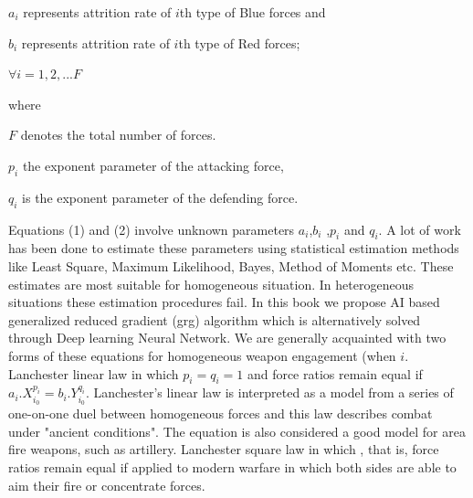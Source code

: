 \documentclass[]{article}
\begin{document}
$a_{i}$ represents attrition rate of $i$th type of Blue forces and 

$b_{i}$ represents attrition rate of $i$th type of Red forces;

\(\forall{i}=1,2,...F\)

where 

\(F\) denotes the total number of forces. 

\(p_{i}\) the exponent parameter of the attacking force, 

\(q_{i}\) is the exponent parameter of the defending force. 


Equations (1) and (2) involve unknown parameters $a_{i}$,$b_{i}$ ,$p_{i}$ and \(q_{i}\). A lot of work has been done to estimate these parameters using statistical estimation methods like Least Square, Maximum Likelihood, Bayes, Method of Moments \autocite{Das:2007,Das:2015} etc. These estimates are most suitable for homogeneous situation. In heterogeneous situations these estimation procedures fail. In this book we propose AI based generalized reduced gradient (\acrshort{grg}) algorithm \autocite{Hashemi2020PerformanceCO,Luo2022GeneralizedDL} which is alternatively solved through Deep learning Neural Network.  We are generally acquainted with two forms of these equations for homogeneous weapon engagement (when \(i\). Lanchester linear law in which \(p_{i}=q_{i}=1\) and force ratios remain equal if
\(a_{i}.X_{i_{0}^{}}^{p_{i}}=b_{i}.Y_{i_{0}^{}}^{q_{i}}\). Lanchester's linear law is interpreted as a model from a series of one-on-one duel between homogeneous forces and this law describes combat under "ancient conditions". The equation is also considered a good model for area fire weapons, such as artillery. Lanchester square law in which , that is, force ratios remain equal if  applied to modern warfare in which both sides are able to aim their fire or concentrate forces.
\end{document}
